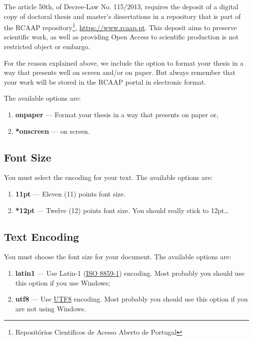 The article 50th, of Decree-Law No. 115/2013, requires the deposit of a digital copy of doctoral thesis and master's dissertations in a repository that is part of the RCAAP  repository\footnote{Repositórios Científicos de Acesso Aberto de Portugal}, \url{https://www.rcaap.pt}.  This deposit aims to preserve scientific work, as well as providing Open Access to scientific production is not restricted object or embargo.

For the reason explained above, we include the option to format your thesis in a way that presents well on screen and/or on paper.   But always remember that your work will be stored in the RCAAP portal in electronic format.

The available options are:

\begin{enumerate}
\item \textbf{onpaper} --- Format your thesis in a way that presents on paper or,
\item \textbf{*onscreen} --- on screen.
\end{enumerate}

\subsection{Font Size} %
\label{ssec:font_size}

You must select the encoding for your text. The available options are:
\begin{enumerate}
	\item \textbf{11pt} --- Eleven (11) points font size.
	\item \textbf{*12pt} --- Twelve (12) points font size. You should really stick to 12pt\ldots
\end{enumerate}

\subsection{Text Encoding} %
\label{ssec:text_encoding}

You must choose the font size for your document. The available options are:
\begin{enumerate}
	\item \textbf{latin1} --- Use Latin-1 (\href{http://en.wikipedia.org/wiki/ISO/IEC_8859-1}{ISO 8859-1}) encoding.  Most probably you should use this option if you use Windows;
	\item \textbf{utf8} --- Use \href{http://en.wikipedia.org/wiki/UTF-8}{UTF8} encoding.    Most probably you should use this option if you are not using Windows.
\end{enumerate}


